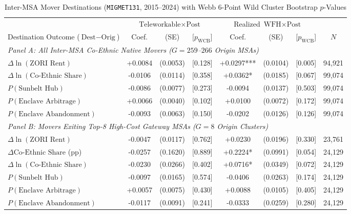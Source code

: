 \begin{table}[t!]
\centering
\caption{Inter-MSA Mover Destinations (\texttt{MIGMET131}, 2015--2024) with Webb 6-Point Wild Cluster Bootstrap $p$-Values}
\label{tab:enclave_arbitrage}
\scriptsize
\renewcommand{\arraystretch}{1.05}
\begin{tabular}{lccccccc}
\toprule
 & \multicolumn{3}{c}{$\text{Teleworkable} \times \text{Post}$} & \multicolumn{3}{c}{Realized $\text{WFH} \times \text{Post}$} & \\
\cmidrule(lr){2-4}\cmidrule(lr){5-7}
Destination Outcome ($\text{Dest} - \text{Orig}$) & Coef. & (SE) & [$p_{\text{WCB}}$] & Coef. & (SE) & [$p_{\text{WCB}}$] & $N$ \\
\midrule
\multicolumn{8}{l}{\textit{Panel A: All Inter-MSA Co-Ethnic Native Movers ($G = 259$--$266$ Origin MSAs)}} \\
$\Delta \ln(\text{ZORI Rent})$ & +0.0084 & (0.0053) & [0.128] & +0.0297*** & (0.0104) & [0.005] & 94,921 \\
$\Delta \ln(\text{Co-Ethnic Share})$ & -0.0106 & (0.0114) & [0.358] & +0.0362* & (0.0185) & [0.067] & 99,074 \\
$P(\text{Sunbelt Hub})$ & -0.0086 & (0.0077) & [0.273] & -0.0094 & (0.0137) & [0.503] & 99,074 \\
$P(\text{Enclave Arbitrage})$ & +0.0066 & (0.0040) & [0.102] & +0.0100 & (0.0072) & [0.172] & 99,074 \\
$P(\text{Enclave Abandonment})$ & -0.0093 & (0.0063) & [0.150] & -0.0202 & (0.0126) & [0.126] & 99,074 \\
\midrule
\multicolumn{8}{l}{\textit{Panel B: Movers Exiting Top-8 High-Cost Gateway MSAs ($G = 8$ Origin Clusters)}} \\
$\Delta \ln(\text{ZORI Rent})$ & -0.0047 & (0.0117) & [0.762] & +0.0230 & (0.0196) & [0.330] & 23,761 \\
$\Delta \text{Co-Ethnic Share}$ (pp) & -0.0257 & (0.1620) & [0.889] & +0.2224* & (0.0991) & [0.054] & 24,129 \\
$\Delta \ln(\text{Co-Ethnic Share})$ & -0.0230 & (0.0266) & [0.402] & +0.0716* & (0.0349) & [0.072] & 24,129 \\
$P(\text{Sunbelt Hub})$ & -0.0097 & (0.0165) & [0.574] & -0.0406 & (0.0263) & [0.174] & 24,129 \\
$P(\text{Enclave Arbitrage})$ & +0.0057 & (0.0075) & [0.430] & +0.0088 & (0.0105) & [0.405] & 24,129 \\
$P(\text{Enclave Abandonment})$ & -0.0117 & (0.0091) & [0.241] & -0.0333 & (0.0259) & [0.280] & 24,129 \\

\end{tabular}
\end{table}
